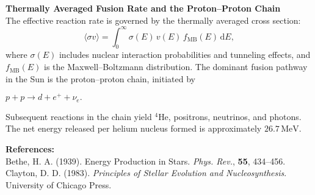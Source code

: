 \begin{technical}
    \vspace{0.2em}
    \textbf{Thermally Averaged Fusion Rate and the Proton–Proton Chain}\\[0.2em]
    The effective reaction rate is governed by the thermally averaged cross section:
    \[
    \langle \sigma v \rangle = \int_0^\infty \sigma(E)\, v(E)\, f_\text{MB}(E)\, \mathrm{d}E,
    \]
    where \(\sigma(E)\) includes nuclear interaction probabilities and tunneling effects, and \(f_\text{MB}(E)\) is the Maxwell–Boltzmann distribution. The dominant fusion pathway in the Sun is the proton–proton chain, initiated by \par
    $p + p \to d + e^+ + \nu_e.$ \par
    Subsequent reactions in the chain yield \( ^4\text{He} \), positrons, neutrinos, and photons. The net energy released per helium nucleus formed is approximately \(26.7\,\text{MeV}\).
    
    \vspace{0.5em}
    \textbf{References:}\\
{\footnotesize
Bethe, H. A. (1939). Energy Production in Stars. \textit{Phys. Rev.}, \textbf{55}, 434–456.\\
Clayton, D. D. (1983). \textit{Principles of Stellar Evolution and Nucleosynthesis}. University of Chicago Press.
}
    \end{technical}
    